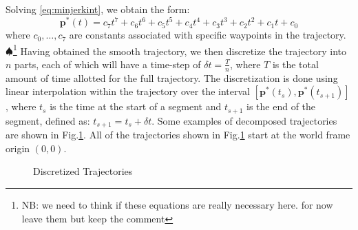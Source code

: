 \documentclass[letterpaper, 10 pt, conference]{ieeeconf}  %
\newcommand\NB[1]{$\spadesuit$\footnote{NB: #1}}
\begin{document}
Solving \eqref{eq:minjerkint}, we obtain the form:
\begin{equation}
    \bm{p}^*(t) = c_7t^7 + c_6t^6 + c_5t^5 + c_4t^4 + c_3t^3 + c_2t^2 + c_1t + c_0 
\end{equation}
where $c_0,\ldots,c_7$ are constants associated with specific waypoints in the trajectory.
\NB{we need to think if these equations are really necessary here. for now leave them but keep the comment}
Having obtained the smooth trajectory, we then discretize the trajectory into $n$ parts, each of which will have a time-step of $\delta t = \frac{T}{n}$, where $T$ is the total amount of time allotted for the full trajectory. The discretization is done using linear interpolation within the trajectory over the interval $[\bm{p}^*(t_s), \bm{p}^*(t_{s+1})]$, where $t_s$ is the time at the start of a segment and $t_{s+1}$ is the end of the segment, defined as: $t_{s+1} = t_s + \delta t$. 
Some examples of decomposed trajectories are shown in Fig.\ref{fig:trajs}. All of the trajectories shown in Fig.\ref{fig:trajs} start at the world frame origin $(0,0)$.

\begin{figure}[h]
	\centering
	\caption{Discretized Trajectories}
	\label{fig:trajs}
\end{figure}
\end{document}
